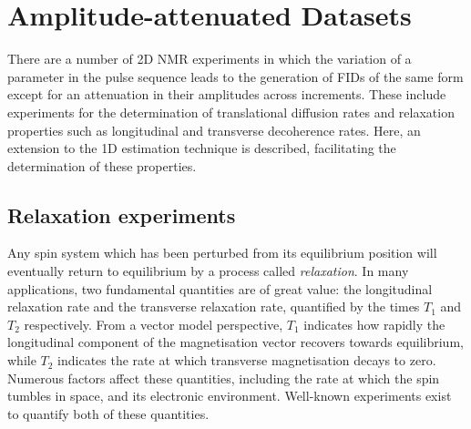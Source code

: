\section{Amplitude-attenuated Datasets}
\label{sec:seq}

There are a number of \ac{2D} \ac{NMR} experiments in which the
variation of a parameter in the pulse sequence leads to the generation of
\acp{FID} of the same form except for an attenuation in their amplitudes across
increments. These include experiments for the determination of translational
diffusion rates and relaxation properties such as longitudinal and transverse
decoherence rates. Here, an extension to the \ac{1D} estimation technique is
described, facilitating the determination of these properties.

\subsection{Relaxation experiments}
\label{subsec:relaxation_experiments}
Any spin system which has been perturbed from its equilibrium position will
eventually return to equilibrium by a process called
\emph{relaxation}\parencites[Chapter 5]{Cavanagh2007}{Goldman2001}{Kuprov2007}.
In many applications, two fundamental quantities are of great value: the
longitudinal relaxation rate and the transverse relaxation rate, quantified by
the times $T_1$ and  $T_2$ respectively. From a vector model perspective, $T_1$
indicates how rapidly the longitudinal component of the magnetisation vector
recovers towards equilibrium, while $T_2$ indicates the rate at which
transverse magnetisation decays to zero. Numerous factors affect these
quantities, including the rate at which the spin tumbles in space, and its
electronic environment. Well-known experiments exist to quantify both of these
quantities.



